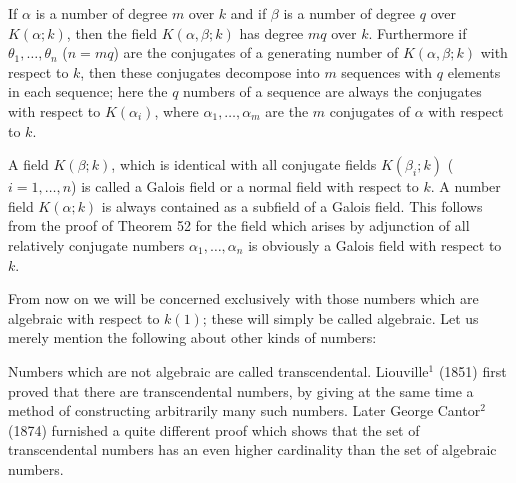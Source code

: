 If $\alpha$ is a number of degree $m$ over $k$ and if $\beta$ is a number of degree $q$ over $K(\alpha; k)$, then the field $K(\alpha, \beta; k)$ has degree $mq$ over $k$. Furthermore if $\theta_1, \ldots, \theta_n$ ($n = mq$) are the conjugates of a generating number of $K(\alpha, \beta; k)$ with respect to $k$, then these conjugates decompose into $m$ sequences with $q$ elements in each sequence; here the $q$ numbers of a sequence are always the conjugates with respect to $K(\alpha_i)$, where $\alpha_1, \ldots, \alpha_m$ are the $m$ conjugates of $\alpha$ with respect to $k$.

A field $K(\beta; k)$, which is identical with all conjugate fields $K(\beta_i; k)$ ($i = 1, \ldots, n$) is called a Galois field or a normal field with respect to $k$. A number field $K(\alpha; k)$ is always contained as a subfield of a Galois field. This follows from the proof of Theorem 52 for the field which arises by adjunction of all relatively conjugate numbers $\alpha_1, \ldots, \alpha_n$ is obviously a Galois field with respect to $k$.

From now on we will be concerned exclusively with those numbers which are algebraic with respect to $k(1)$; these will simply be called algebraic. Let us merely mention the following about other kinds of numbers:

Numbers which are not algebraic are called transcendental. Liouville$^1$ (1851) first proved that there are transcendental numbers, by giving at the same time a method of constructing arbitrarily many such numbers. Later George Cantor$^2$ (1874) furnished a quite different proof which shows that the set of transcendental numbers has an even higher cardinality than the set of algebraic numbers.
